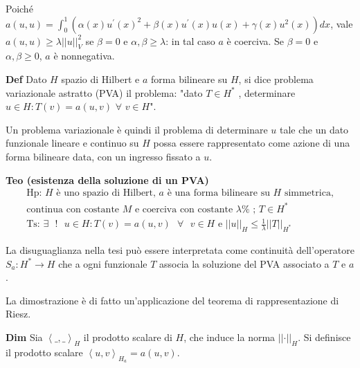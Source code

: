 \documentclass{article}
\begin{document}
\begin{enumerate}
Poich\'{e} $a\left( u,u\right) =\int_{0}^{1}\left( \alpha \left( x\right)
u^{\prime }\left( x\right) ^{2}+\beta \left( x\right) u^{\prime }\left(
x\right) u\left( x\right) +\gamma \left( x\right) u^{2}\left( x\right)
\right) dx$, vale $a\left( u,u\right) \geq \lambda \left\vert \left\vert
u\right\vert \right\vert _{V}^{2}$ se $\beta =0$ e $\alpha ,\beta \geq
\lambda $: in tal caso $a$ \`{e} coerciva. Se $\beta =0$ e $\alpha ,\beta
\geq 0$, $a$ \`{e} nonnegativa.
\end{enumerate}

\textbf{Def} Dato $H$ spazio di Hilbert e $a$ forma bilineare su $H$, si
dice problema variazionale astratto (PVA) il problema: "dato $T\in H^{\ast }$%
, determinare $u\in H:T\left( v\right) =a\left( u,v\right) $ $\forall $ $%
v\in H$".

Un problema variazionale \`{e} quindi il problema di determinare $u$ tale
che un dato funzionale lineare e continuo su $H$ possa essere rappresentato
come azione di una forma bilineare data, con un ingresso fissato a $u$.

\textbf{Teo (esistenza della soluzione di un PVA)}%
\begin{gather*}
\text{Hp: }H\text{ \`{e} uno spazio di Hilbert, }a\text{ \`{e} una forma
bilineare su }H\text{ simmetrica,} \\
\text{continua con costante }M\text{ e coerciva con costante }\lambda \text{%
; }T\in H^{\ast } \\
\text{Ts: }\exists \text{ }!\text{ }u\in H:T\left( v\right) =a\left(
u,v\right) \text{ }\forall \text{ }v\in H\text{ e }\left\vert \left\vert
u\right\vert \right\vert _{H}\leq \frac{1}{\lambda }\left\vert \left\vert
T\right\vert \right\vert _{H^{\ast }}
\end{gather*}

La disuguaglianza nella tesi pu\`{o} essere interpretata come continuit\`{a}
dell'operatore $S_{a}:H^{\ast }\rightarrow H$ che a ogni funzionale $T$
associa la soluzione del PVA associato a $T$ e $a$.

La dimostrazione \`{e} di fatto un'applicazione del teorema di
rappresentazione di Riesz.

\textbf{Dim} Sia $\left\langle \_,\_\right\rangle _{H}$ il prodotto scalare
di $H$, che induce la norma $\left\vert \left\vert \cdot \right\vert
\right\vert _{H}$. Si definisce il prodotto scalare $\left\langle
u,v\right\rangle _{H_{a}}=a\left( u,v\right) $.
\end{document}
